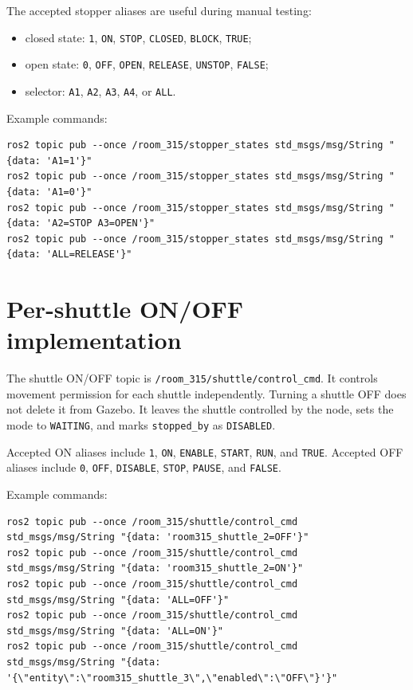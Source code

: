 \documentclass[12pt,a4paper]{report}
\newcommand{\codenext}[1]{\par\Needspace{#1\baselineskip}}
\begin{document}
The accepted stopper aliases are useful during manual testing:

\begin{itemize}
\item closed state: \texttt{1}, \texttt{ON}, \texttt{STOP}, \texttt{CLOSED},
\texttt{BLOCK}, \texttt{TRUE};
\item open state: \texttt{0}, \texttt{OFF}, \texttt{OPEN}, \texttt{RELEASE},
\texttt{UNSTOP}, \texttt{FALSE};
\item selector: \texttt{A1}, \texttt{A2}, \texttt{A3}, \texttt{A4}, or
\texttt{ALL}.
\end{itemize}

Example commands:

\begin{lstlisting}[style=terminalcode]
ros2 topic pub --once /room_315/stopper_states std_msgs/msg/String "{data: 'A1=1'}"
ros2 topic pub --once /room_315/stopper_states std_msgs/msg/String "{data: 'A1=0'}"
ros2 topic pub --once /room_315/stopper_states std_msgs/msg/String "{data: 'A2=STOP A3=OPEN'}"
ros2 topic pub --once /room_315/stopper_states std_msgs/msg/String "{data: 'ALL=RELEASE'}"
\end{lstlisting}

\section{Per-shuttle ON/OFF implementation}

The shuttle ON/OFF topic is
\texttt{/room\_315/shuttle/control\_cmd}. It controls movement permission for
each shuttle independently. Turning a shuttle OFF does not delete it from
Gazebo. It leaves the shuttle controlled by the node, sets the mode to
\texttt{WAITING}, and marks \texttt{stopped\_by} as \texttt{DISABLED}.

\codenext{40}


Accepted ON aliases include \texttt{1}, \texttt{ON}, \texttt{ENABLE},
\texttt{START}, \texttt{RUN}, and \texttt{TRUE}. Accepted OFF aliases include
\texttt{0}, \texttt{OFF}, \texttt{DISABLE}, \texttt{STOP}, \texttt{PAUSE}, and
\texttt{FALSE}.

Example commands:

\begin{lstlisting}[style=terminalcode]
ros2 topic pub --once /room_315/shuttle/control_cmd std_msgs/msg/String "{data: 'room315_shuttle_2=OFF'}"
ros2 topic pub --once /room_315/shuttle/control_cmd std_msgs/msg/String "{data: 'room315_shuttle_2=ON'}"
ros2 topic pub --once /room_315/shuttle/control_cmd std_msgs/msg/String "{data: 'ALL=OFF'}"
ros2 topic pub --once /room_315/shuttle/control_cmd std_msgs/msg/String "{data: 'ALL=ON'}"
ros2 topic pub --once /room_315/shuttle/control_cmd std_msgs/msg/String "{data: '{\"entity\":\"room315_shuttle_3\",\"enabled\":\"OFF\"}'}"
\end{lstlisting}
\end{document}
